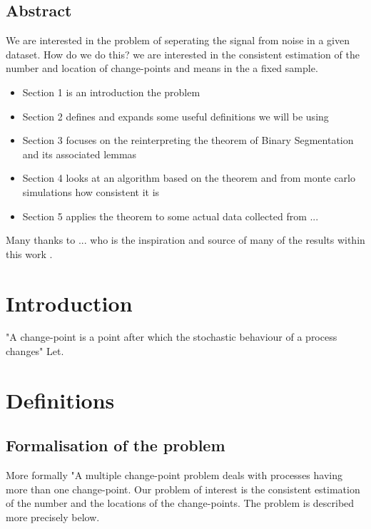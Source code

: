 \documentclass[a4paper, 12pt, notitlepage]{report}
\begin{document}
\section*{Abstract}
We are interested in the problem of seperating the signal from noise in a given dataset. How do we do this?
we are interested in the consistent estimation of the number and location of change-points and means in the a fixed sample.
\begin{itemize}
\item[] Section 1 is an introduction the problem
\item[] Section 2 defines and expands some useful definitions we will be using 
\item[] Section 3 focuses on the reinterpreting the theorem of Binary Segmentation and its associated lemmas 
\item[] Section 4  looks at an algorithm based on the theorem and from monte carlo simulations how consistent it is \cite{Venk}
\item[] Section 5 applies the theorem to some actual data collected from ... \cite{fryzlewicz2018}
\end{itemize}
Many thanks to ... who is the inspiration and source of many of the results within this work \cite{fryzlewicz2014}.


\tableofcontents 


\chapter{Introduction}
%
"A change-point is a point after which the stochastic behaviour of a process changes" 
 Let.

\chapter{Definitions}
%

\section{Formalisation of the problem }

More formally "A multiple change-point problem deals with processes having more than one change-point. Our problem of interest is the consistent estimation of the number and the locations of the change-points. The problem is described more precisely below. 
\end{document}

